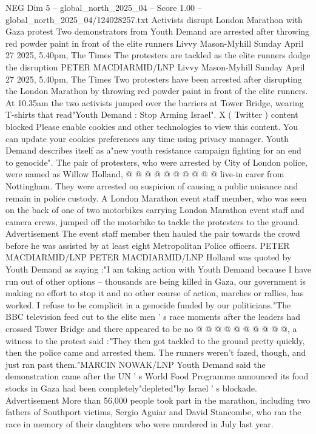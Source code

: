 \begin{textsample}{NEG Dim 5 – global\_north\_2025\_04 – Score 1.00 – global\_north\_2025\_04/124028257.txt}  \label{ex:f5_neg_350}
Activists disrupt London Marathon with Gaza protest Two demonstrators from Youth Demand are arrested after throwing red powder paint in front of the elite runners Livvy Mason-Myhill Sunday April 27 2025, 5.40pm, The Times The protesters are tackled as the elite runners dodge the disruption PETER MACDIARMID/LNP Livvy Mason-Myhill Sunday April 27 2025, 5.40pm, The Times Two protesters have been arrested after disrupting the London Marathon by throwing red powder paint in front of the elite runners.
At 10.35am the two activists jumped over the barriers at Tower Bridge, wearing T-shirts that read"Youth Demand : Stop Arming Israel".
X ( Twitter ) content blocked Please enable cookies and other technologies to view this content.
You can update your cookies preferences any time using privacy manager.
Youth Demand describes itself as a"new youth resistance campaign fighting for an end to genocide".
The pair of protesters, who were arrested by City of London police, were named as Willow Holland, @ @ @ @ @ @ @ @ @ @ live-in carer from Nottingham.
They were arrested on suspicion of causing a public nuisance and remain in police custody.
A London Marathon event staff member, who was seen on the back of one of two motorbikes carrying London Marathon event staff and camera crews, jumped off the motorbike to tackle the protesters to the ground.
Advertisement The event staff member then hauled the pair towards the crowd before he was assisted by at least eight Metropolitan Police officers.
PETER MACDIARMID/LNP PETER MACDIARMID/LNP Holland was quoted by Youth Demand as saying :"I am taking action with Youth Demand because I have run out of other options -- thousands are being killed in Gaza, our government is making no effort to stop it and no other course of action, marches or rallies, has worked.
I refuse to be complicit in a genocide funded by our politicians."The BBC television feed cut to the elite men ' s race moments after the leaders had crossed Tower Bridge and there appeared to be no @ @ @ @ @ @ @ @ @ @, a witness to the protest said :"They then got tackled to the ground pretty quickly, then the police came and arrested them.
The runners weren't fazed, though, and just ran past them."MARCIN NOWAK/LNP Youth Demand said the demonstration came after the UN ' s World Food Programme announced its food stocks in Gaza had been completely"depleted"by Israel ' s blockade.
Advertisement More than 56,000 people took part in the marathon, including two fathers of Southport victims, Sergio Aguiar and David Stancombe, who ran the race in memory of their daughters who were murdered in July last year.

\end{textsample}
